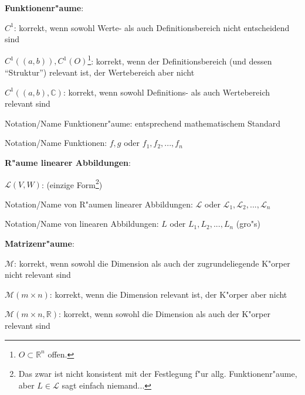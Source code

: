 \begin{list_sabina}
\begin{sub_list_sabina}
        \end{sub_list_sabina}
\item
\textbf{Funktionenr"aume}:
        \begin{sub_list_sabina}
        \item
        $C^{1}$: korrekt, wenn sowohl Werte- als auch Definitionsbereich 
        nicht entscheidend sind
        \item
        $C^{1}((a,b)), C^{1}(O)$\footnote{$O\subset\mathbb{R}^n$ offen.}: korrekt, wenn der Definitionsbereich (und dessen ``Struktur'') 
        relevant ist, der Wertebereich aber nicht
        \item
        $C^{1}((a,b), \mathbb{C})$: korrekt, wenn sowohl Definitions- als 
        auch Wertebereich relevant sind
        \item
        Notation/Name Funktionenr"aume: entsprechend mathematischem Standard
        \item
        Notation/Name Funktionen: $f, g$ oder $f_{1},f_{2},...,f_{n}$ 
        \end{sub_list_sabina}
\item
\textbf{R"aume linearer Abbildungen}:
        \begin{sub_list_sabina}
        \item
        $\mathcal{L}(V,W)$: (einzige Form\footnote{Das zwar ist nicht konsistent
        mit der Festlegung f"ur allg. Funktionenr"aume, aber 
        $L \in \mathcal{L}$ sagt einfach niemand...}) 
        \item
        Notation/Name von R"aumen linearer Abbildungen: $\mathcal{L}$ oder $\mathcal{L}_{1}, \mathcal{L}_{2}, ..., \mathcal{L}_{n}$
        \item
        Notation/Name von linearen Abbildungen: $L$ oder $L_{1},L_{2},...,L_{n}$ (gro"s)
        \end{sub_list_sabina}
\item
\textbf{Matrizenr"aume}:
        \begin{sub_list_sabina}
        \item
        $\mathcal{M}$: korrekt, wenn sowohl die Dimension als auch der zugrundeliegende
        K"orper nicht relevant sind
        \item
        $\mathcal{M}(m \times n)$: korrekt, wenn die Dimension relevant ist, 
        der K"orper aber nicht
        \item
        $\mathcal{M}(m \times n, \mathbb{R})$: korrekt, wenn sowohl die Dimension als 
        auch der K"orper relevant sind
        \item

\end{sub_list_sabina}
\end{list_sabina}
